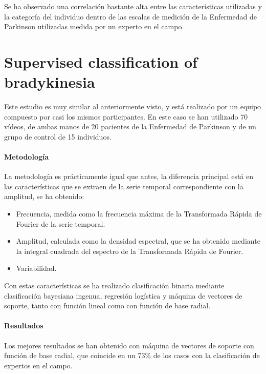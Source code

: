 Se ha observado una correlación bastante alta entre las características
utilizadas y la categoría del individuo dentro de las escalas de medición de la
Enfermedad de Parkinson utilizadas medida por un experto en el campo.


\section{Supervised classification of bradykinesia}

Este estudio \cite{williams2020supervised} es muy similar al anteriormente
visto, y está realizado por un equipo compuesto por casi los mismos
participantes. En este caso se han utilizado 70 vídeos, de ambas manos de 20
pacientes de la Enfermedad de Parkinson y de un grupo de control de 15
individuos.


\paragraph{Metodología}

La metodología es prácticamente igual que antes, la diferencia principal está en
las características que se extraen de la serie temporal correspondiente con la
amplitud, se ha obtenido:

\begin{itemize}
    \item Frecuencia, medida como la frecuencia máxima de la Transformada Rápida
          de Fourier de la serie temporal.
    \item Amplitud, calculada como la densidad espectral, que se ha obtenido
          mediante la integral cuadrada del espectro de la Transformada Rápida
          de Fourier.
    \item Variabilidad.
\end{itemize}

Con estas características se ha realizado clasificación binaria mediante
clasificación bayesiana ingenua, regresión logística y máquina de vectores de
soporte, tanto con función lineal como con función de base radial.


\paragraph{Resultados}

Los mejores resultados se han obtenido con máquina de vectores de soporte con
función de base radial, que coincide en un 73\% de los casos con la
clasificación de expertos en el campo.
